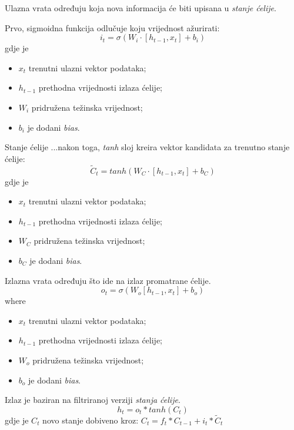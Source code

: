 \documentclass{beamer}
\begin{document}
  \begin{frame}{Ulazna vrata}
    određuju koja nova informacija će biti upisana u \textit{stanje ćelije}.
    
    Prvo, sigmoidna funkcija odlučuje koju vrijednost ažurirati:
    $$ i_{t} = \sigma (W_{i} \cdot [h_{t-1}, x_{t}] + b_{i}) $$ 
    gdje je
    \begin{itemize}
      \item[] $ x_{t} $ trenutni ulazni vektor podataka;
      \item[] $ h_{t-1} $ prethodna vrijednosti izlaza ćelije;
      \item[] $ W_{i} $ pridružena težinska vrijednost;
      \item[] $ b_{i} $ je dodani \textit{bias}.
    \end{itemize}
  \end{frame}

  \begin{frame}{Stanje ćelije}
    ...nakon toga, \textit{tanh} sloj kreira vektor kandidata za trenutno stanje ćelije:
    $$ \tilde{C}_{t} = tanh (W_{C} \cdot [h_{t-1}, x_{t}] + b_{C}) $$
    gdje je
    \begin{itemize}
      \item[] $ x_{t} $ trenutni ulazni vektor podataka;
      \item[] $ h_{t-1} $ prethodna vrijednosti izlaza ćelije;
      \item[] $ W_{C} $ pridružena težinska vrijednost;
      \item[] $ b_{C} $ je dodani \textit{bias}.
    \end{itemize}
  \end{frame}

  \begin{frame}{Izlazna vrata}
    određuju što ide na izlaz promatrane ćelije.
    $$ o_{t} = \sigma (W_{o} [h_{t-1}, x_{t}] + b_{o}) $$ 
    where
    \begin{itemize}
      \item[] $ x_{t} $ trenutni ulazni vektor podataka;
      \item[] $ h_{t-1} $ prethodna vrijednosti izlaza ćelije;
      \item[] $ W_{o} $ pridružena težinska vrijednost;
      \item[] $ b_{o} $ je dodani \textit{bias}.
    \end{itemize}
    
    Izlaz je baziran na filtriranoj verziji \textit{stanja ćelije}.
    $$ h_{t} = o_{t} * tanh(C_{t})$$
    gdje je 
    $ C_{t} $ novo stanje dobiveno kroz:
    $ C_{t} = f_{t} * C_{t-1} + i_{t} * \tilde{C}_{t} $
  \end{frame}
\end{document}
